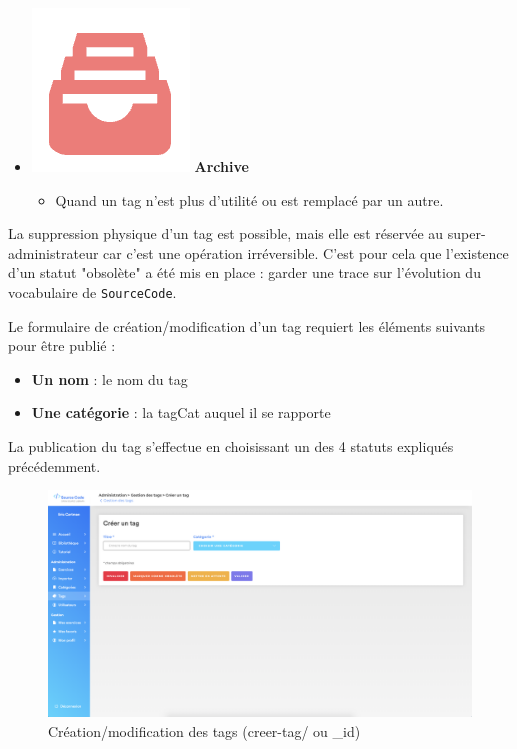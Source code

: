 \begin{itemize}
    \item \includegraphics[valign=b,height=1.4\fontcharht\font`X]{images/client/archive.png} \textbf{Archive}
    \begin{itemize}
        \item Quand un \gls{tag} n'est plus d'utilité ou est remplacé par un autre.
    \end{itemize}
\end{itemize}

La suppression physique d'un \gls{tag} est possible, mais elle est réservée au super-administrateur car c'est une opération irréversible. C'est pour cela que l'existence d'un statut "obsolète" a été mis en place : garder une trace sur l'évolution du vocabulaire de \texttt{SourceCode}.


Le formulaire de création/modification d'un \gls{tag} requiert les éléments suivants pour être publié :

\begin{itemize}
    \item \textbf{Un nom} : le nom du \gls{tag}
    \item \textbf{Une catégorie} : la \gls{tagCat} auquel il se rapporte
\end{itemize}

La publication du \gls{tag} s'effectue en choisissant un des 4 statuts expliqués précédemment.

\begin{figure}[H]
    \includegraphics[width=\textwidth,height=\textheight,keepaspectratio]{images/client/create-tag-admin.png}
    \centering
    \caption[SourceCode : création/modification des \glspl{tag}]{Création/modification des \glspl{tag} (creer-tag/ ou \_id)}
\end{figure}

